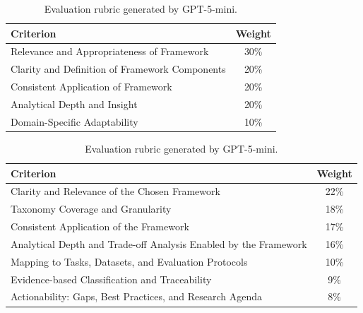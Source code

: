 \documentclass[11pt]{article}
\begin{document}
\begin{table}[h]
\centering
\caption{Evaluation rubrics generated by the three different Judge LLMs.}
\label{tab:all_rubrics}
\footnotesize

\begin{subtable}{\textwidth}
    \centering
    \caption{Evaluation rubric generated by GPT-4o-mini.}
    \label{tab:rubric_gpt4o}
    \begin{tabularx}{0.8\textwidth}{X c}
        \toprule
        \textbf{Criterion} & \textbf{Weight} \\
        \midrule
        Relevance and Appropriateness of Framework & 30\% \\
        Clarity and Definition of Framework Components & 20\% \\
        Consistent Application of Framework & 20\% \\
        Analytical Depth and Insight & 20\% \\
        Domain-Specific Adaptability & 10\% \\
        \bottomrule
    \end{tabularx}
\end{subtable}

\vspace{1em} %

\begin{subtable}{\textwidth}
    \centering
    \caption{Evaluation rubric generated by GPT-5-mini.}
    \label{tab:rubric_gpt5}
    \begin{tabularx}{0.8\textwidth}{X c}
        \toprule
        \textbf{Criterion} & \textbf{Weight} \\
        \midrule
        Clarity and Relevance of the Chosen Framework & 22\% \\
        Taxonomy Coverage and Granularity & 18\% \\
        Consistent Application of the Framework & 17\% \\
        Analytical Depth and Trade-off Analysis Enabled by the Framework & 16\% \\
        Mapping to Tasks, Datasets, and Evaluation Protocols & 10\% \\
        Evidence-based Classification and Traceability & 9\% \\
        Actionability: Gaps, Best Practices, and Research Agenda & 8\% \\
        \bottomrule
    \end{tabularx}
\end{subtable}


\end{table}
\end{document}
